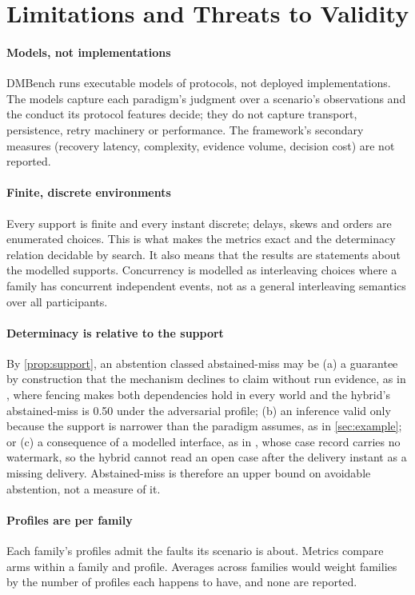 \section{Limitations and Threats to Validity}
\label{sec:limitations}

\paragraph{Models, not implementations} DMBench runs executable models of protocols, not deployed implementations. The models capture each paradigm's judgment over a scenario's observations and the conduct its protocol features decide; they do not capture transport, persistence, retry machinery or performance. The framework's secondary measures (recovery latency, complexity, evidence volume, decision cost) are not reported.

\paragraph{Finite, discrete environments} Every support is finite and every instant discrete; delays, skews and orders are enumerated choices. This is what makes the metrics exact and the determinacy relation decidable by search. It also means that the results are statements about the modelled supports. Concurrency is modelled as interleaving choices where a family has concurrent independent events, not as a general interleaving semantics over all participants.

\paragraph{Determinacy is relative to the support} By \cref{prop:support}, an abstention classed abstained-miss may be (a) a guarantee by construction that the mechanism declines to claim without run evidence, as in , where fencing makes both dependencies hold in every world and the hybrid's abstained-miss is 0.50 under the adversarial profile; (b) an inference valid only because the support is narrower than the paradigm assumes, as in \cref{sec:example}; or (c) a consequence of a modelled interface, as in , whose case record carries no watermark, so the hybrid cannot read an open case after the delivery instant as a missing delivery. Abstained-miss is therefore an upper bound on avoidable abstention, not a measure of it.

\paragraph{Profiles are per family} Each family's profiles admit the faults its scenario is about. Metrics compare arms within a family and profile. Averages across families would weight families by the number of profiles each happens to have, and none are reported.

